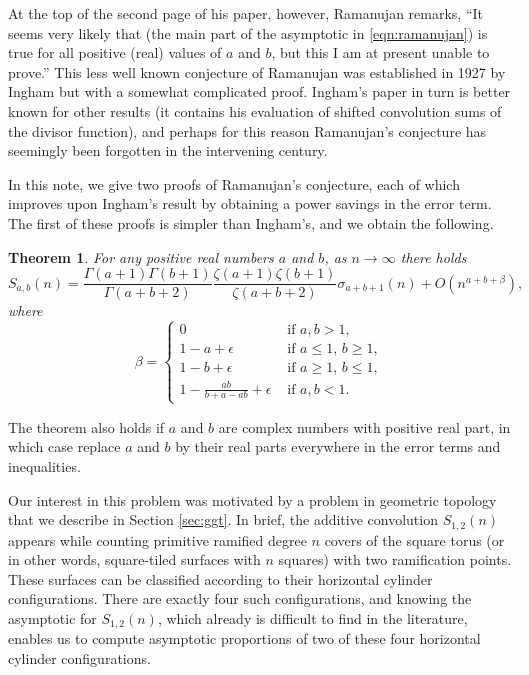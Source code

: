 \documentclass[12pt]{amsart}
\newtheorem{theorem}{Theorem}
\numberwithin{equation}{section}
\numberwithin{theorem}{section}
\begin{document}
At the top of the second page of his paper, however, Ramanujan remarks, ``It seems very likely that (the main part of the asymptotic in \eqref{eqn:ramanujan}) is true for all positive (real) values of $a$ and $b$, but this I am at present unable to prove.''  This less well known conjecture of Ramanujan was established in 1927 by Ingham \cite{Ingham} but with a somewhat complicated proof.  Ingham's paper in turn is better known for other results (it contains his evaluation of shifted convolution sums of the divisor function), and perhaps for this reason Ramanujan's conjecture has seemingly been forgotten in the intervening century.  

In this note, we give two proofs of Ramanujan's conjecture, each of which improves upon Ingham's result by obtaining a power savings in the error term.  The first of these proofs is simpler than
Ingham's, and we obtain the following.

\begin{theorem}\label{thm:main}
For any positive real numbers $a$ and $b$, as $n\to\infty$ there holds
\begin{equation}\label{eq:main}
S_{a,b}(n) = \frac{\Gamma(a+1)\Gamma(b+1)}{\Gamma(a+b+2)} \frac{\zeta(a+1)\zeta(b+1)}{\zeta(a+b+2)} \sigma_{a+b+1}(n) + O(n^{a+b + \beta}),
\end{equation}
where
\[
\beta = \begin{cases}
0 & \text{ if $a, b > 1$}, \\
1 - a + \epsilon & \text{ if $a \leq 1$, $b \geq 1$}, \\
1 - b + \epsilon & \text{ if $a \geq 1$, $b \leq 1$}, \\
1 - \frac{ab}{b + a - ab} + \epsilon & \text{ if $a, b < 1$}.
 \end{cases}
 \]
\end{theorem}
The theorem also holds if $a$ and $b$ are complex numbers with positive real part, in which case replace $a$ and $b$ by their real parts
everywhere in the error terms and inequalities.

Our interest in this problem was motivated by a problem in geometric topology that we describe in Section \ref{sec:ggt}. In brief, the additive convolution $S_{1,2}(n)$ appears while counting primitive ramified degree $n$ covers of the square torus (or in other words, square-tiled surfaces with $n$ squares) with two ramification points. These surfaces can be classified according to their horizontal cylinder configurations.  There are exactly four such configurations, and knowing the asymptotic for $S_{1,2}(n)$, which already is difficult to find in the literature, enables us to compute asymptotic proportions of two of these four horizontal cylinder configurations.
\end{document}
